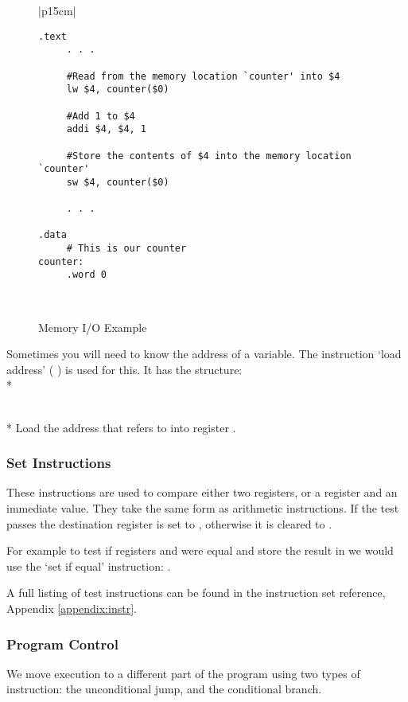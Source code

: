 \begin{figure}[btp]
\begin{center}
\begin{tabular}{|p{15cm}|}
\hline
\begin{verbatim}
.text
     . . .

     #Read from the memory location `counter' into $4
     lw $4, counter($0)

     #Add 1 to $4
     addi $4, $4, 1

     #Store the contents of $4 into the memory location `counter'
     sw $4, counter($0)

     . . .
     
.data
     # This is our counter
counter:
     .word 0 
\end{verbatim}%
\\
\hline
\end{tabular}
\end{center}
\caption{Memory I/O Example}
\label{memio}
\end{figure}

Sometimes you will need to know the address of a variable.  The 
instruction `load address' (  ) is used for this. It has the 
structure:
\\*

 \\*
Load the address that  refers to into register \regd.  

\subsubsection{Set Instructions}
These instructions are used to compare either two registers, or a
register and an immediate value.  They take the same form as
arithmetic instructions.  If the test passes the destination register
is set to , otherwise it is cleared to .

For example to test if registers  and  were equal and store the
result in  we would use the `set if equal' instruction: 
.

A full listing of test instructions can be found in the instruction set reference, Appendix \ref{appendix:instr}.

\subsubsection{Program Control}
We move execution to a different part of the program using two types of 
instruction: the unconditional jump, and the conditional branch.  

